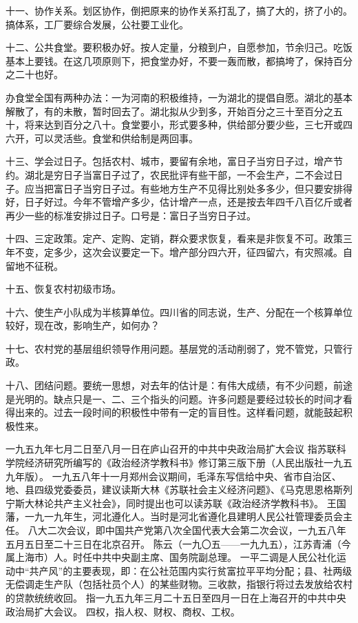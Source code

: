 十一、协作关系。划区协作，倒把原来的协作关系打乱了，搞了大的，挤了小的。搞体系，工厂要综合发展，公社要工业化。

十二、公共食堂。要积极办好。按人定量，分粮到户，自愿参加，节余归己。吃饭基本上要钱。在这几项原则下，把食堂办好，不要一轰而散，都搞垮了，保持百分之二十也好。

办食堂全国有两种办法：一为河南的积极维持，一为湖北的提倡自愿。湖北的基本解散了，有的未散，暂时回去了。湖北拟从少到多，开始百分之三十至百分之五十，将来达到百分之八十。食堂要小，形式要多种，供给部分要少些，三七开或四六开，可以灵活些。食堂和供给制是两回事。

十三、学会过日子。包括农村、城市，要留有余地，富日子当穷日子过，增产节约。湖北是穷日子当富日子过了，农民批评有些干部，一不会生产，二不会过日子。应当把富日子当穷日子过。有些地方生产不见得比别处多多少，但只要安排得好，日子好过。今年不管增产多少，估计增产一点，还是按去年四千八百亿斤或者再少一些的标准安排过日子。口号是：富日子当穷日子过。

十四、三定政策。定产、定购、定销，群众要求恢复，看来是非恢复不可。政策三年不变，定多少，这次会议要定一下。增产部分四六开，征四留六，有灾照减。自留地不征税。

十五、恢复农村初级市场。

十六、使生产小队成为半核算单位。四川省的同志说，生产、分配在一个核算单位较好，现在改，影响生产，如何办？

十七、农村党的基层组织领导作用问题。基层党的活动削弱了，党不管党，只管行政。

十八、团结问题。要统一思想，对去年的估计是：有伟大成绩，有不少问题，前途是光明的。缺点只是一、二、三个指头的问题。许多问题是要经过较长的时间才看得出来的。过去一段时间的积极性中带有一定的盲目性。这样看问题，就能鼓起积极性来。

\begin{maonote}
一九五九年七月二日至八月一日在庐山召开的中共中央政治局扩大会议
指苏联科学院经济研究所编写的《政治经济学教科书》修订第三版下册（人民出版社一九五九年版）。
一九五八年十一月郑州会议期间，毛泽东写信给中央、省市自治区、地、县四级党委委员，建议读斯大林《苏联社会主义经济问题》、《马克思恩格斯列宁斯大林论共产主义社会》，同时提出也可以读苏联《政治经济学教科书》。
王国藩，一九一九年生，河北遵化人。当时是河北省遵化县建明人民公社管理委员会主任。
八大二次会议，即中国共产党第八次全国代表大会第二次会议，一九五八年五月五日至二十三日在北京召开。
陈云（一九〇五——一九九五），江苏青浦（今属上海市）人。时任中共中央副主席、国务院副总理。
一平二调是人民公社化运动中“共产风”的主要表现，即：在公社范围内实行贫富拉平平均分配；县、社两级无偿调走生产队（包括社员个人）的某些财物。三收款，指银行将过去发放给农村的贷款统统收回。
指一九五九年三月二十五日至四月一日在上海召开的中共中央政治局扩大会议。
四权，指人权、财权、商权、工权。
\end{maonote}
